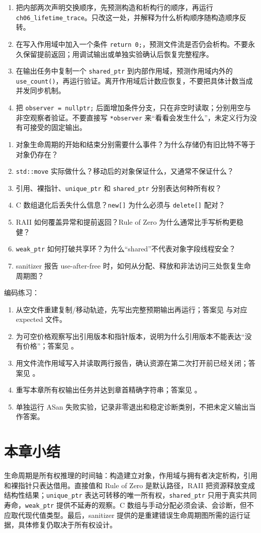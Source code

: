 \begin{enumerate}
  \item 把内部两次声明交换顺序，先预测构造和析构行的顺序，再运行 \texttt{ch06\_lifetime\_trace}。只改这一处，并解释为什么析构顺序随构造顺序反转。
  \item 在写入作用域中加入一个条件 \texttt{return 0;}，预测文件流是否仍会析构。不要永久保留提前返回；用调试输出或单独实验确认后恢复完整程序。
  \item 在输出任务中复制一个 \texttt{shared\_ptr} 到内部作用域，预测作用域内外的 \texttt{use\_count()}，再运行验证。离开作用域后计数应恢复，不要把具体计数当成并发同步机制。
  \item 把 \texttt{observer = nullptr;} 后面增加条件分支，只在非空时读取；分别用空与非空观察者验证。不要直接写 \texttt{*observer} 来“看看会发生什么”，未定义行为没有可接受的固定输出。
\end{enumerate}

\begin{enumerate}
  \item 对象生命周期的开始和结束分别需要什么事件？为什么存储仍有旧比特不等于对象仍存在？
  \item \texttt{std::move} 实际做什么？移动后的对象保证什么，又通常不保证什么？
  \item 引用、裸指针、\texttt{unique\_ptr} 和 \texttt{shared\_ptr} 分别表达何种所有权？
  \item C 数组退化后丢失什么信息？\texttt{new[]} 为什么必须与 \texttt{delete[]} 配对？
  \item RAII 如何覆盖异常和提前返回？Rule of Zero 为什么通常比手写析构更稳健？
  \item \texttt{weak\_ptr} 如何打破共享环？为什么“shared”不代表对象字段线程安全？
  \item sanitizer 报告 use-after-free 时，如何从分配、释放和非法访问三处恢复生命周期图？
\end{enumerate}

编码练习：

\begin{enumerate}
  \item 从空文件重建复制/移动轨迹，先写出完整预期输出再运行；答案见  与对应 expected 文件。
  \item 为可空价格观察写出引用版本和指针版本，说明为什么引用版本不能表达“没有价格”；答案见 。
  \item 用文件流作用域写入并读取两行报告，确认资源在第二次打开前已经关闭；答案见 。
  \item 重写本章所有权输出任务并达到章首精确字符串；答案见 。
  \item 单独运行 ASan 失败实验，记录非零退出和稳定诊断类别，不把未定义输出当作答案。
\end{enumerate}


\section{本章小结}

生命周期是所有权推理的时间轴：构造建立对象，作用域与拥有者决定析构，引用和裸指针只表达借用。直接值和 Rule of Zero 是默认路径，RAII 把资源释放变成结构性结果；\texttt{unique\_ptr} 表达可转移的唯一所有权，\texttt{shared\_ptr} 只用于真实共同寿命，\texttt{weak\_ptr} 提供不延寿的观察。C 数组与手动分配必须会读、会诊断，但不应取代现代值类型。最后，sanitizer 提供的是重建错误生命周期图所需的运行证据，具体修复仍取决于所有权设计。
